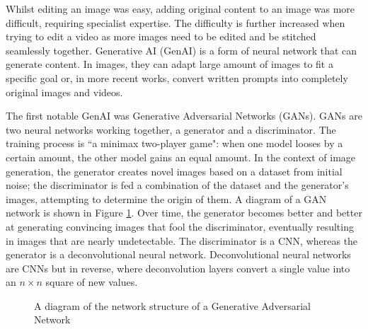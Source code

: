 Whilst editing an image was easy, adding original content to an image was more difficult, requiring specialist expertise. The difficulty is further increased when trying to edit a video as more images need to be edited and be stitched seamlessly together. Generative AI (GenAI) is a form of neural network that can generate content. In images, they can adapt large amount of images to fit a specific goal or, in more recent works, convert written prompts into completely original images and videos.

The first notable GenAI was Generative Adversarial Networks (GANs)\cite{goodfellow2014generative}. GANs are two neural networks working together, a generator and a discriminator. The training process is ``a minimax two-player game": when one model looses by a certain amount, the other model gains an equal amount. In the context of image generation, the generator creates novel images based on a dataset from initial noise; the discriminator is fed a combination of the dataset and the generator's images, attempting to determine the origin of them. A diagram of a GAN network is shown in Figure \ref{fig:gan-diagram}. Over time, the generator becomes better and better at generating convincing images that fool the discriminator, eventually resulting in images that are nearly undetectable. The discriminator is a CNN, whereas the generator is a deconvolutional neural network\cite{zeiler2011adaptive}. Deconvolutional neural networks are CNNs but in reverse, where deconvolution layers convert a single value into an $n \times n$ square of new values.

\begin{figure}[h]
    \centering
    \caption{A diagram of the network structure of a Generative Adversarial Network}
    \label{fig:gan-diagram}
\end{figure}

